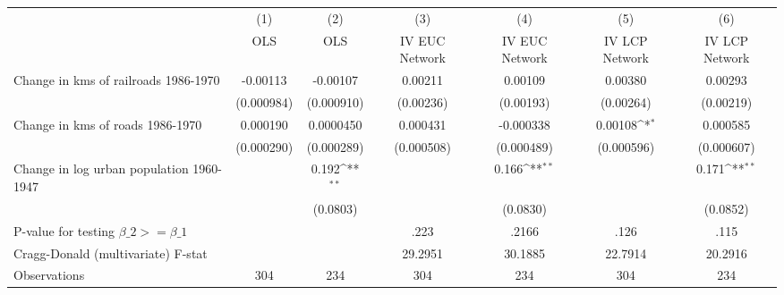 {
\def\sym#1{\ifmmode^{#1}\else\(^{#1}\)\fi}
\begin{tabular}{l*{6}{c}}
\hline\hline
                &\multicolumn{1}{c}{(1)}&\multicolumn{1}{c}{(2)}&\multicolumn{1}{c}{(3)}&\multicolumn{1}{c}{(4)}&\multicolumn{1}{c}{(5)}&\multicolumn{1}{c}{(6)}\\
                &\multicolumn{1}{c}{OLS}&\multicolumn{1}{c}{OLS}&\multicolumn{1}{c}{IV EUC Network}&\multicolumn{1}{c}{IV EUC Network}&\multicolumn{1}{c}{IV LCP Network}&\multicolumn{1}{c}{IV LCP Network}\\
\hline
Change in kms of railroads 1986-1970& -0.00113         & -0.00107         &  0.00211         &  0.00109         &  0.00380         &  0.00293         \\
                &(0.000984)         &(0.000910)         &(0.00236)         &(0.00193)         &(0.00264)         &(0.00219)         \\
[1em]
Change in kms of roads 1986-1970& 0.000190         &0.0000450         & 0.000431         &-0.000338         &  0.00108\sym{*}  & 0.000585         \\
                &(0.000290)         &(0.000289)         &(0.000508)         &(0.000489)         &(0.000596)         &(0.000607)         \\
[1em]
Change in log urban population 1960-1947&                  &    0.192\sym{**} &                  &    0.166\sym{**} &                  &    0.171\sym{**} \\
                &                  & (0.0803)         &                  & (0.0830)         &                  & (0.0852)         \\
\hline
P-value for testing $\beta\_{2} >= \beta\_{1}$&                  &                  &     .223         &    .2166         &     .126         &     .115         \\
Cragg-Donald (multivariate) F-stat&                  &                  &  29.2951         &  30.1885         &  22.7914         &  20.2916         \\
Observations    &      304         &      234         &      304         &      234         &      304         &      234         \\
\hline\hline
\end{tabular}
}
